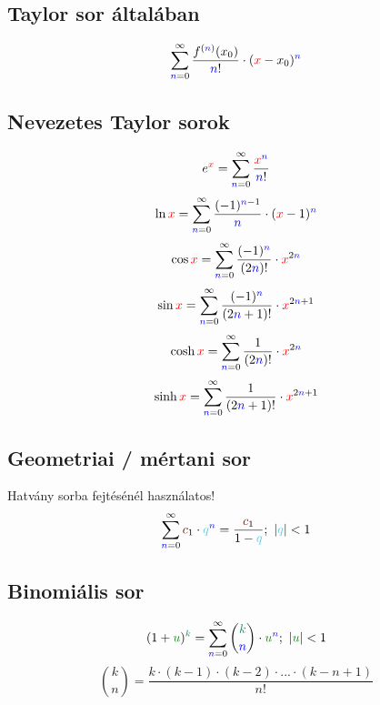 \documentclass[a4paper,12pt]{article}
\begin{document}
\subsection{Taylor sor általában}

\begin{equation}
\sumi \frac{f^{(\n)}(x_0)}{\n!} \cdot (\x-x_0)^{\n}
\end{equation}

\subsection{Nevezetes Taylor sorok}
\begin{equation}
e^{\x} = \sumi \frac{{\x}^{\n}}{\n!}
\end{equation}
\begin{equation}
\ln \x = \sumi \frac{(-1)^{\n-1}}{\n} \cdot (\x-1)^{\n}
\end{equation}
\begin{equation}
\cos \x = \sumi \frac{(-1)^{\n}}{(2\n)!} \cdot \x^{2\n}
\end{equation}
\begin{equation}
\sin \x = \sumi \frac{(-1)^{\n}}{(2\n+1)!} \cdot \x^{2\n+1}
\end{equation}
\begin{equation}
\cosh \x = \sumi \frac{1}{(2\n)!} \cdot \x^{2\n}
\end{equation}
\begin{equation}
\sinh \x = \sumi \frac{1}{(2\n+1)!} \cdot \x^{2\n+1}
\end{equation}

\subsection{Geometriai / mértani sor}
Hatvány sorba fejtésénél használatos!
\begin{equation}
\sumi \c_1 \cdot \q^{\n} = \frac{\c_1}{1-\q};\ |\q| < 1
\end{equation}

\subsection{Binomiális sor}
\begin{equation}
  (1+\u)^{\k} = \sumi \binom{\k}{\n} \cdot {\u}^{\n};\ |\u| < 1
\end{equation}
\begin{equation}
  \binom{k}{n} = \frac{k \cdot (k-1) \cdot (k-2)\cdot ... \cdot (k-n+1)}{n!}
\end{equation}
\end{document}
